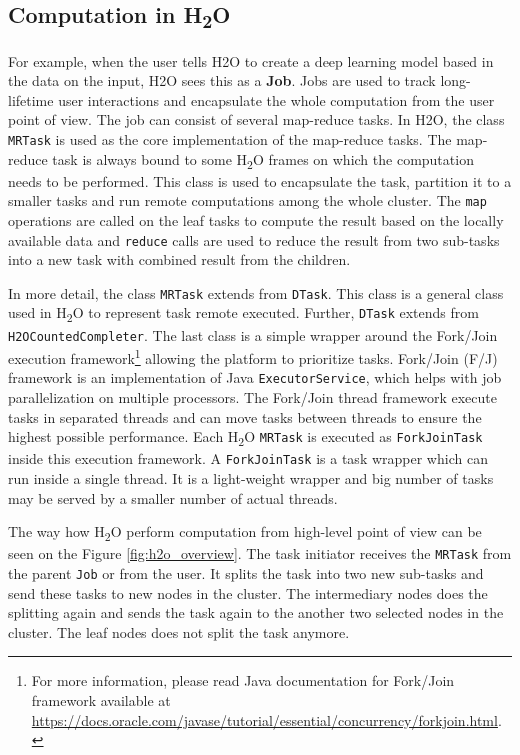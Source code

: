 \subsection{Computation in H\textsubscript{2}O}
For example, when the user tells H2O to create a deep learning model based in the data on the input, H2O sees this as a \textbf{Job}. Jobs are used to track long-lifetime user interactions and encapsulate the whole computation from the user point of view. The job can consist of several map-reduce tasks. In H2O, the class \texttt{MRTask} is used as the core implementation of the map-reduce tasks. The map-reduce task is always bound to some  H\textsubscript{2}O frames on which the computation needs to be performed. This class is used to encapsulate the task, partition it to a smaller tasks and run remote computations among the whole cluster. The \texttt{map} operations are called on the leaf tasks to compute the result based on the locally available data and \texttt{reduce} calls are used to reduce the result from two sub-tasks into a new task with combined result from the children.

In more detail, the class \texttt{MRTask} extends from \texttt{DTask}. This class is a general class used in H\textsubscript{2}O to represent task remote executed. Further, \texttt{DTask} extends from \texttt{H2OCountedCompleter}. The last class is a simple wrapper around the Fork/Join execution framework\footnote{For more information, please read Java documentation for Fork/Join framework available at \url{https://docs.oracle.com/javase/tutorial/essential/concurrency/forkjoin.html}.} allowing the platform to prioritize tasks. Fork/Join (F/J) framework is an implementation of Java \texttt{ExecutorService}, which helps with job parallelization on multiple processors. The Fork/Join thread framework execute tasks in separated threads and can move tasks between threads to ensure the highest possible performance. Each H\textsubscript{2}O \texttt{MRTask} is executed as \texttt{ForkJoinTask} inside this execution framework. A \texttt{ForkJoinTask} is a task wrapper which can run inside a single thread. It is a light-weight wrapper and big number of tasks may be served by a smaller number of actual threads.

The way how H\textsubscript{2}O perform computation from high-level point of view can be seen on the Figure \ref{fig:h2o_overview}. The task initiator receives the \texttt{MRTask} from the parent \texttt{Job} or from the user. It splits the task into two new sub-tasks and send these tasks to new nodes in the cluster. The intermediary nodes does the splitting again and sends the task again to the another two selected nodes in the cluster. The leaf nodes does not split the task anymore.

